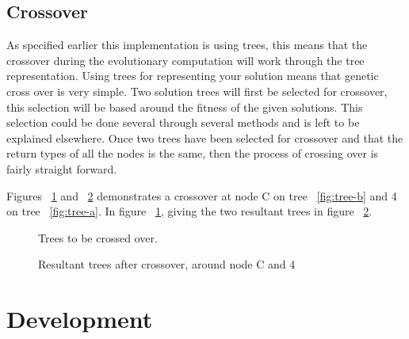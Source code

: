 \documentclass[12pt]{article}
\begin{document}
\subsection{Crossover}

As specified earlier this implementation is using trees, this means that the crossover during the evolutionary computation
will work through the tree representation. Using trees for representing your solution means that genetic cross over is
very simple. Two solution trees will first be selected for crossover, this selection will be based around the fitness of the given
solutions. This selection could be done several through several methods and is left to be explained elsewhere. Once two trees
have been selected for crossover and that the return types of all the nodes is the same, then the process of crossing over
is fairly straight forward.

Figures ~\ref{fig:treesab} and ~\ref{fig:resultanttrees} demonstrates a crossover at node C on tree ~\ref{fig:tree-b} and 4 on tree ~\ref{fig:tree-a}. In
figure  ~\ref{fig:treesab}, giving the two resultant trees in figure ~\ref{fig:resultanttrees}.

\begin{figure} [ht]
\centering
\subfigure[]{\label{fig:tree-b}\Tree [.A [ D E ].B [ F G H I ].C ]}
\hfil
\subfigure[]{\label{fig:tree-a}\Tree [.1 [ 4 5 6 7 ].2 [ 8 9 ].3 ]}
\caption{Trees to be crossed over.\label{fig:treesab}}
\end{figure}

\begin{figure} [ht]
\centering
\subfigure[]{\label{fig:tree-Ra}\Tree [.A [ D E ].B 4 ]}
\hfil
{}
\caption{Resultant trees after crossover, around node C and 4 \label{fig:resultanttrees}}
\end{figure}


\section{Development}
\end{document}
